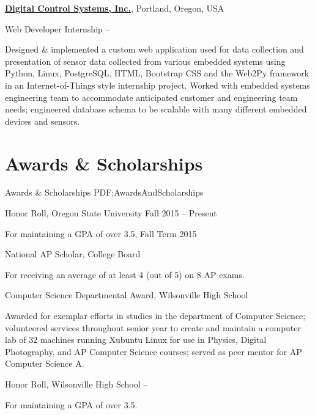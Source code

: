 \documentclass[letterpaper,MMMyyyy,nonstop]{simpleresumecv}
\begin{document}
\begin{body}
\href{http://www.dcs-inc.net}
{\textbf{Digital Control Systems, Inc.}},
Portland, Oregon, USA

\Gap
\BulletItem
Web Developer
Internship
\hfill
{} --
\begin{detail}
\SubBulletItem
Designed \& implemented a custom web application used for data collection and presentation of sensor data collected from various embedded systems using Python, Linux, PostgreSQL, HTML, Bootstrap CSS and the Web2Py framework in an Internet-of-Things style internship project.
\SubBulletItem
Worked with embedded systems engineering team to accommodate anticipated customer and engineering team needs; engineered database schema to be scalable with many different embedded devices and sensors.
\end{detail}


\section
{Awards \&\newline
Scholarships}
{Awards \& Scholarships}
{PDF:AwardsAndScholarships}

\BulletItem
Honor Roll, 
Oregon State University
\hfill
Fall 2015 -- Present
\begin{detail}
\SubItem
For maintaining a GPA of over 3.5, Fall Term 2015
\end{detail}

\Gap
\BulletItem
National AP Scholar, 
College Board
\hfill
{}
\begin{detail}
\SubItem
For receiving an average of at least 4 (out of 5) on 8 AP exams.
\end{detail}

\Gap
\BulletItem
Computer Science Departmental Award, 
Wilsonville High School
\hfill
{}
\begin{detail}
\SubItem
Awarded for exemplar efforts in studies in the department of Computer Science; volunteered services throughout senior year to create and maintain a computer lab of 32 machines running Xubuntu Linux for use in Physics, Digital Photography, and AP Computer Science courses; served as peer mentor for AP Computer Science A.
\end{detail}

\GapNoBreak
\BulletItem
Honor Roll, 
Wilsonville High School
\hfill
{} --
\begin{detail}
\SubItem
For maintaining a GPA of over 3.5.
\end{detail}


\end{body}
\end{document}

